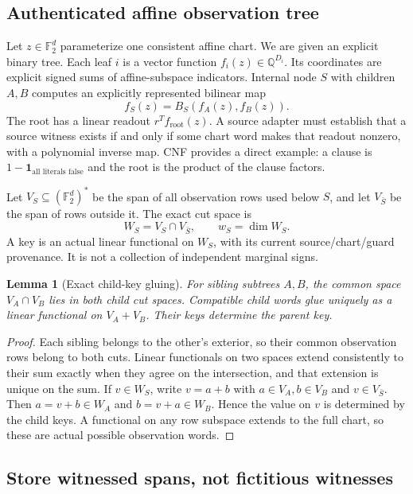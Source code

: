 \documentclass[11pt,letterpaper]{article}
\newtheorem{lemma}[theorem]{Lemma}
\theoremstyle{definition}
\newcommand{\F}{\mathbb F_2}
\begin{document}
\subsection{Authenticated affine observation tree}

Let $z\in\F^d$ parameterize one consistent affine chart. We are given an explicit binary tree. Each leaf $i$ is a vector function $f_i(z)\in\mathbb Q^{D_i}$. Its coordinates are explicit signed sums of affine-subspace indicators. Internal node $S$ with children $A,B$ computes an explicitly represented bilinear map
\[
f_S(z)=B_S(f_A(z),f_B(z)).
\]
The root has a linear readout $r^T f_{\mathrm{root}}(z)$. A source adapter must establish that a source witness exists if and only if some chart word makes that readout nonzero, with a polynomial inverse map. CNF provides a direct example: a clause is $1-\mathbf1_{\text{all literals false}}$ and the root is the product of the clause factors.

Let $V_S\subseteq(\F^d)^*$ be the span of all observation rows used below $S$, and let $V_{\bar S}$ be the span of rows outside it. The exact cut space is
\[
W_S=V_S\cap V_{\bar S},\qquad w_S=\dim W_S.
\]
A key is an actual linear functional on $W_S$, with its current source/chart/guard provenance. It is not a collection of independent marginal signs.

\begin{lemma}[Exact child-key gluing]
For sibling subtrees $A,B$, the common space $V_A\cap V_B$ lies in both child cut spaces. Compatible child words glue uniquely as a linear functional on $V_A+V_B$. Their keys determine the parent key.
\end{lemma}
\begin{proof}
Each sibling belongs to the other's exterior, so their common observation rows belong to both cuts. Linear functionals on two spaces extend consistently to their sum exactly when they agree on the intersection, and that extension is unique on the sum. If $v\in W_S$, write $v=a+b$ with $a\in V_A,b\in V_B$ and $v\in V_{\bar S}$. Then $a=v+b\in W_A$ and $b=v+a\in W_B$. Hence the value on $v$ is determined by the child keys. A functional on any row subspace extends to the full chart, so these are actual possible observation words.
\end{proof}

\subsection{Store witnessed spans, not fictitious witnesses}
\end{document}
